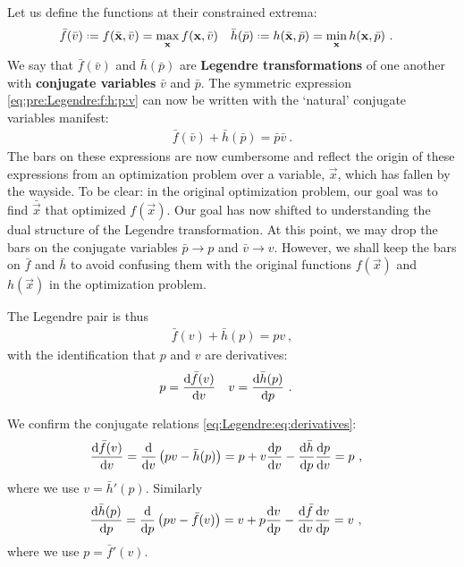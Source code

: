 Let us define the functions at their constrained extrema:
\begin{align}
    \bar f(\bar v) 
        &
        \defeq f(\bar{\vec{x}}, \bar v)
        = \max_\vec{x} f(\vec{x}, \bar v)
    &
    \bar h(\bar p) 
        &
        \defeq h(\bar{\vec{x}}, \bar p) 
        = \min_\vec{x} h(\vec{x}, \bar p)
        \ .
\end{align}
We say that $\bar f(\bar v)$ and $\bar h(\bar p)$ are \textbf{Legendre transformations} of one another with \textbf{conjugate variables} $\bar v$ and $\bar p$. The symmetric expression \eqref{eq:pre:Legendre:f:h:p:v} can now be written with the `natural' conjugate variables manifest: 
\begin{align}
    \bar f(\bar v) + \bar h (\bar p)  = \bar p \bar v \ .
\end{align}
The bars on these expressions are now cumbersome and reflect the origin of these expressions from an optimization problem over a variable, $\vec{x}$, which has fallen by the wayside. To be clear: in the original optimization problem, our goal was to find $\bar{\vec{x}}$ that optimized $f(\vec{x})$. Our goal has now shifted to understanding the dual structure of the Legendre transformation. 
% 
At this point, we may drop the bars on the conjugate variables $\bar p \to p$ and $\bar v \to v$. However, we shall keep the bars on $\bar f$ and $\bar h$ to avoid confusing them with the original functions $f(\vec{x})$ and $h(\vec{x})$ in the optimization problem.

The Legendre pair is thus
\begin{align}
    \bar f(v) + \bar h (p)  =  p v \ ,
    \label{eq:Legendre:eq}
\end{align}
with the identification that $p$ and $v$ are derivatives:
\begin{align}
    p &= \frac{\operatorname{d}\mkern-3mu^{}\mkern-1mu{\bar f}(v)}{\operatorname{d}\mkern-3mu^{}\mkern-1mu{v}}
    &
    v &= \frac{\operatorname{d}\mkern-3mu^{}\mkern-1mu{\bar h}(p)}{\operatorname{d}\mkern-3mu^{}\mkern-1mu{p}} \ .
    \label{eq:Legendre:eq:derivatives}
\end{align}

\begin{example}
We confirm the conjugate relations \eqref{eq:Legendre:eq:derivatives}:
\begin{align}
    \frac{\D{\bar f}(v)}{\D v} &=
    \frac{\D{}}{\D{v}}\left(pv - \bar h(p)\right)
    =
    p + v\frac{\D{p}}{\D{v}} 
    - \frac{\D{\bar h}}{\D{p}}
      \frac{\D{p}}{\D{v}}
    = p \ ,
\end{align}
where we use $v= \bar h'(p)$. Similarly
\begin{align}
    \frac{\D{\bar h}(p)}{\D p} &=
    \frac{\D{}}{\D{p}}\left(pv - \bar f(v)\right)
    =
    v + p\frac{\D{v}}{\D{p}} 
    - \frac{\D{\bar f}}{\D{v}}
      \frac{\D{v}}{\D{p}}
    = v \ ,
\end{align}
where we use $p= \bar f'(v)$. 
\end{example}

